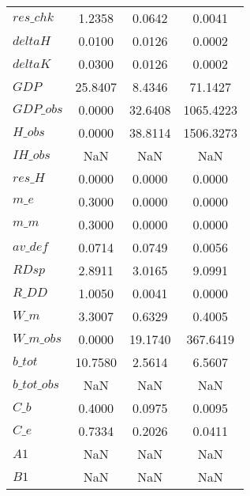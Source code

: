 \begin{center}
\begin{longtable}{lccc}
$res\_chk                   $	 & 	       1.2358	 & 	       0.0642	 & 	       0.0041 \\ 
$deltaH                     $	 & 	       0.0100	 & 	       0.0126	 & 	       0.0002 \\ 
$deltaK                     $	 & 	       0.0300	 & 	       0.0126	 & 	       0.0002 \\ 
$GDP                        $	 & 	      25.8407	 & 	       8.4346	 & 	      71.1427 \\ 
$GDP\_obs                   $	 & 	       0.0000	 & 	      32.6408	 & 	    1065.4223 \\ 
$H\_obs                     $	 & 	       0.0000	 & 	      38.8114	 & 	    1506.3273 \\ 
$IH\_obs                    $	 & 	          NaN	 & 	          NaN	 & 	          NaN \\ 
$res\_H                     $	 & 	       0.0000	 & 	       0.0000	 & 	       0.0000 \\ 
$m\_e                       $	 & 	       0.3000	 & 	       0.0000	 & 	       0.0000 \\ 
$m\_m                       $	 & 	       0.3000	 & 	       0.0000	 & 	       0.0000 \\ 
$av\_def                    $	 & 	       0.0714	 & 	       0.0749	 & 	       0.0056 \\ 
$RDsp                       $	 & 	       2.8911	 & 	       3.0165	 & 	       9.0991 \\ 
$R\_DD                      $	 & 	       1.0050	 & 	       0.0041	 & 	       0.0000 \\ 
$W\_m                       $	 & 	       3.3007	 & 	       0.6329	 & 	       0.4005 \\ 
$W\_m\_obs                  $	 & 	       0.0000	 & 	      19.1740	 & 	     367.6419 \\ 
$b\_tot                     $	 & 	      10.7580	 & 	       2.5614	 & 	       6.5607 \\ 
$b\_tot\_obs                $	 & 	          NaN	 & 	          NaN	 & 	          NaN \\ 
$C\_b                       $	 & 	       0.4000	 & 	       0.0975	 & 	       0.0095 \\ 
$C\_e                       $	 & 	       0.7334	 & 	       0.2026	 & 	       0.0411 \\ 
$A1                         $	 & 	          NaN	 & 	          NaN	 & 	          NaN \\ 
$B1                         $	 & 	          NaN	 & 	          NaN	 & 	          NaN \\ 

\end{longtable}
\end{center}
